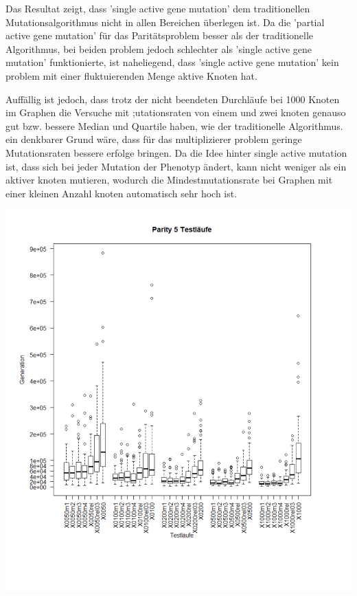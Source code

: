 Das Resultat zeigt, dass 'single active gene mutation' dem traditionellen Mutationsalgorithmus nicht in allen Bereichen überlegen ist. Da die 'partial active gene mutation' für das Paritätsproblem besser als der traditionelle Algorithmus, bei beiden problem jedoch schlechter als 'single active gene mutation' funktionierte, ist naheliegend, dass 'single active gene mutation' kein problem mit einer fluktuierenden Menge aktive Knoten hat. 

Auffällig ist jedoch, dass trotz der nicht beendeten Durchläufe bei 1000 Knoten im Graphen die Versuche mit ;utationsraten von einem und zwei knoten genauso gut bzw. bessere Median und Quartile haben, wie der traditionelle Algorithmus. ein denkbarer Grund wäre, dass für das multiplizierer problem geringe Mutationsraten bessere erfolge bringen. Da die Idee hinter single active mutation ist, dass sich bei jeder Mutation der Phenotyp ändert, kann nicht weniger als ein aktiver knoten mutieren, wodurch die Mindestmutationsrate bei Graphen mit einer kleinen Anzahl knoten automatisch sehr hoch ist.


\hspace*{-2.0cm}	\includegraphics[scale=0.5]{parity5plotzoomed}
	
